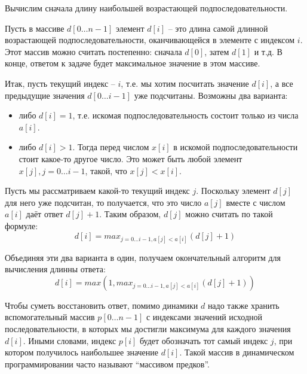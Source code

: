 \documentclass[a4paper,11pt]{article}
\begin{document}
Вычислим сначала длину наибольшей возрастающей подпоследовательности.

Пусть в массиве $d[0 \ldots n-1]$ элемент $d[i]$ -- это длина самой длинной
возрастающей подпоследовательности, оканчивающейся в элементе с индексом $i$.
Этот массив можно считать постепенно: сначала $d[0]$, затем $d[1]$ и т.д. В
конце, ответом к задаче будет максимальное значение в этом массиве.

Итак, пусть текущий индекс -- $i$, т.е. мы хотим посчитать значение $d[i]$, а
все предыдущие значения $d[0 \ldots i-1]$ уже подсчитаны. Возможны два варианта:
\begin{itemize}
\item либо $d[i] = 1$, т.е. искомая подпоследовательность состоит только из
  числа $a[i]$.
\item либо $d[i] > 1$. Тогда перед числом $x[i]$ в искомой подпоследовательности
  стоит какое-то другое число. Это может быть любой элемент
  $x[j], j = 0 \ldots i-1$, такой, что $x[j] < x[i]$.
\end{itemize}
Пусть мы рассматриваем какой-то текущий индекс $j$. Поскольку элемент $d[j]$ для
него уже подсчитан, то получается, что это число $a[j]$ вместе с числом $a[i]$
даёт ответ $d[j] + 1$. Таким образом, $d[j]$ можно считать по такой формуле:
\begin{equation*}
  d[i] = max_{j=0 \ldots i-1, a[j] < a[i]} (d[j] + 1)
\end{equation*}

Объединяя эти два варианта в один, получаем окончательный алгоритм для
вычисления длинны ответа:
\begin{equation*}
  d[i] = max(1, max_{j=0 \ldots i-1, a[j] < a[i]} (d[j] + 1))
\end{equation*}

Чтобы суметь восстановить ответ, помимо динамики $d$ надо также хранить
вспомогательный массив $p[0 \ldots n-1]$ с индексами значений исходной
последовательности, в которых мы достигли максимума для каждого значения
$d[i]$. Иными словами, индекс $p[i]$ будет обозначать тот самый индекс $j$, при
котором получилось наибольшее значение $d[i]$. Такой массив в динамическом
программировании часто называют ``массивом предков''.
\end{document}
